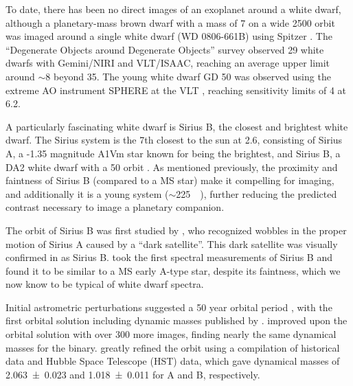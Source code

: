 \documentclass[twocolumn]{aastex631}
\begin{document}
To date, there has been no direct images of an exoplanet around a white dwarf, although a planetary-mass brown dwarf with a mass of \qty{7}{\jupitermass} on a wide \qty{2500}{\au} orbit was imaged around a single white dwarf (WD 0806-661B) using Spitzer \citep{luhman_discovery_2011}. The ``Degenerate Objects around Degenerate Objects'' survey \citep[DODO;][]{hogan_dodo_2009} observed 29 white dwarfs with Gemini/NIRI and VLT/ISAAC, reaching an average upper limit around $\sim$\qty{8}{\jupitermass} beyond \qty{35}{\au}. The young white dwarf GD 50 was observed using the extreme AO instrument SPHERE at the VLT \citep{xu_extreme-ao_2015}, reaching sensitivity limits of \qty{4}{\jupitermass} at \qty{6.2}{\au}.

A particularly fascinating white dwarf is Sirius B, the closest and brightest white dwarf. The Sirius system is the 7th closest to the sun at \qty{2.6}{\parsec}, consisting of Sirius A, a -1.35 magnitude A1Vm star known for being the brightest, and Sirius B, a DA2 white dwarf with a \qty{50}{\year} orbit \citep{bond_sirius_2017,gaia_collaboration_gaia_2018}. As mentioned previously, the proximity and faintness of Sirius B (compared to a MS star) make it compelling for imaging, and additionally it is a young system ($\sim$\qty{225}{\mega\year}), further reducing the predicted contrast necessary to image a planetary companion.

The orbit of Sirius B was first studied by \citet{bessel_variations_1844}, who recognized wobbles in the proper motion of Sirius A caused by a ``dark satellite''. This dark satellite was visually confirmed in \citet{bond_companion_1862} as Sirius B. \citet{adams_spectrum_1915} took the first spectral measurements of Sirius B and found it to be similar to a MS early A-type star, despite its faintness, which we now know to be typical of white dwarf spectra. 

Initial astrometric perturbations suggested a 50 year orbital period \citep{auwers_orbit_1864}, with the first orbital solution including dynamic masses published by \citet{van_den_bos_orbit_1960}. \citet{gatewood_study_1978} improved upon the \citeauthor{van_den_bos_orbit_1960} orbital solution with over 300 more images, finding nearly the same dynamical masses for the binary. \citet{bond_sirius_2017} greatly refined the orbit using a compilation of historical data and Hubble Space Telescope (HST) data, which gave dynamical masses of \qty{2.063+-0.023}{\solarmass} and \qty{1.018+-0.011}{\solarmass} for A and B, respectively.
\end{document}
